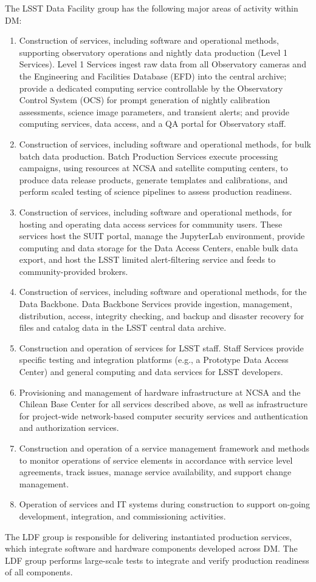 The LSST Data Facility group has the following major areas of activity within DM:
\begin{enumerate}
	\item	Construction of services, including software and operational methods, supporting observatory operations and nightly data production (Level 1 Services). Level 1 Services ingest raw data from all Observatory cameras and the Engineering and Facilities Database (EFD) into the central archive; provide a dedicated computing service controllable by the Observatory Control System (OCS) for prompt generation of nightly calibration assessments, science image parameters, and transient alerts; and provide computing services, data access, and a QA portal for Observatory staff.
	\item	Construction of services, including software and operational methods, for bulk batch data production. Batch Production Services execute processing campaigns, using resources at NCSA and satellite computing centers, to produce data release products, generate templates and calibrations, and perform scaled testing of science pipelines to assess production readiness.
	\item	Construction of services, including software and operational methods, for hosting and operating data access services for community users. These services host the SUIT portal, manage the JupyterLab environment, provide computing and data storage for the Data Access Centers, enable bulk data export, and host the LSST limited alert-filtering service and feeds to community-provided brokers.
	\item	Construction of services, including software and operational methods, for the Data Backbone. Data Backbone Services provide ingestion, management, distribution, access, integrity checking, and backup and disaster recovery for files and catalog data in the LSST central data archive.
	\item	Construction and operation of services for LSST staff. Staff Services provide specific testing and integration platforms (e.g., a Prototype Data Access Center) and general computing and data services for LSST developers.
	\item	Provisioning and management of hardware infrastructure at NCSA and the Chilean Base Center for all services described above, as well as infrastructure for project-wide network-based computer security services and authentication and authorization services.
	\item	Construction and operation of a service management framework and methods to monitor operations of service elements in accordance with service level agreements, track issues, manage service availability, and support change management.
	\item	Operation of services and IT systems during construction to support on-going development, integration, and commissioning activities.
\end{enumerate}
The LDF group is responsible for delivering instantiated production services, which integrate software and hardware components developed across DM. The LDF group performs large-scale tests to integrate and verify production readiness of all components.
